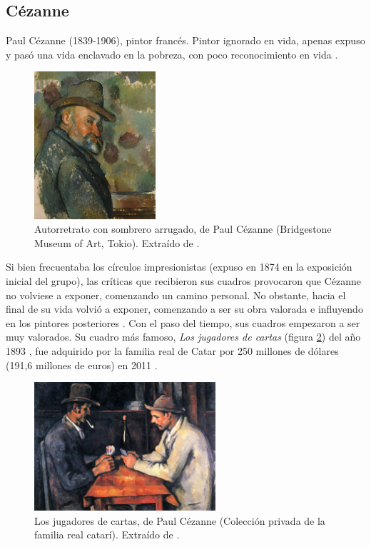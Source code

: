\documentclass[../main.tex]{subfiles}
\begin{document}
\subsection{Cézanne}

Paul Cézanne (1839-1906), pintor francés. Pintor ignorado en vida, apenas expuso y pasó una vida enclavado en la pobreza, con poco reconocimiento en vida \cite{CalvoSantos2016-3}.

\begin{figure}[h]
    \centering
    \includegraphics[width=0.4\textwidth]{imagenes/Autorretrato con sombrero arrugado.jpg}
    \caption[Autorretrato con sombrero arrugado, de Paul Cézanne]{Autorretrato con sombrero arrugado, de Paul Cézanne (Bridgestone Museum of Art, Tokio). Extraído de \cite{Cezanne1894}.}
    \label{fig:cezanne_autorretrato}
\end{figure}

Si bien frecuentaba los círculos impresionistas (expuso en 1874 en la exposición inicial del grupo), las críticas que recibieron sus cuadros provocaron que Cézanne no volviese a exponer, comenzando un camino personal. No obstante, hacia el final de su vida volvió a exponer, comenzando a ser su obra valorada e influyendo en los pintores posteriores \cite{ElizaldeOcampo2020}.\newline
Con el paso del tiempo, sus cuadros empezaron a ser muy valorados. Su cuadro más famoso, \textit{Los jugadores de cartas} (figura \ref{fig:cezanne_cartas}) del año 1893 , fue adquirido por la familia real de Catar por 250 millones de dólares (191,6 millones de euros) en 2011 \cite{EFE2016}. \newline

\begin{figure}[h]
    \centering
    \includegraphics[width=0.6\textwidth]{imagenes/Los jugadores de cartas.jpg}
    \caption[Los jugadores de cartas, de Paul Cézanne]{Los jugadores de cartas, de Paul Cézanne (Colección privada de la familia real catarí). Extraído de \cite{Cezanne1893}.}
    \label{fig:cezanne_cartas}
\end{figure}
\end{document}
